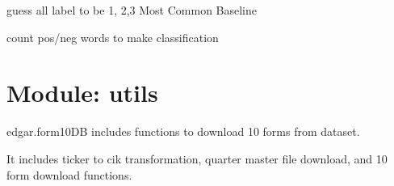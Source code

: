 \documentclass[letterpaper,10pt,english]{sphinxmanual}
\begin{document}

\begin{fulllineitems}
\label{forecaster:forecaster.doMostCommonClassify}
guess all label to be 1, 2,3
Most Common Baseline

\end{fulllineitems}


\begin{fulllineitems}
\label{forecaster:forecaster.doWordListClassify}
count pos/neg words to make classification

\end{fulllineitems}



\chapter{Module: utils}
\label{utils:module-utils}\label{utils::doc}\label{utils:module-form10DB}
edgar.form10DB includes functions to download 10 forms from dataset.

It includes ticker to cik transformation, quarter master file download, and 10 form download functions.
\end{document}
